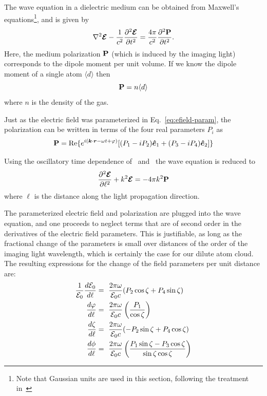 The wave equation in a dielectric medium can be obtained from Maxwell's
equations\footnote{Note that Gaussian units are used in this section, following
the treatment in~\cite{auzinsh2010optically}}, and is given by 
\begin{equation}
 \nabla^{2} \bm{\mathcal{E}} 
 -\frac{1}{c^{2}} \frac{\partial^{2} \bm{\mathcal{E}} } {\partial t^{2}} 
  = \frac{4\pi}{c^{2}} \frac{\partial^{2} \bm{\mathrm{P}} }{\partial t^{2} } .
\end{equation} 
Here, the medium polarization $\bm{\mathrm{P}}$ (which is induced by the imaging light)
corresponds to the dipole moment per unit volume.   If we know the dipole
moment of a single atom $\langle d \rangle$ then \begin{equation}
 \bm{\mathrm{P}} = n \langle d \rangle 
\end{equation}
where $n$ is the density of the gas.

Just as the electric field was parameterized in Eq.~\ref{eq:efield-param}, the
polarization can be written in terms of the four real parameters
$P_{i}$ as 
\begin{equation}
 \bm{\mathrm{P}} = \text{Re} \lbrace e^{i(\bm{k}\cdot\bm{r} - \omega t + \varphi) }
   [(P_{1} - i P_{2}) \bm{\hat{e}}_{1} + ( P_{3} - i P_{4}) \bm{\hat{e}}_{2} ] \rbrace
  \label{eq:pol-param}
\end{equation}

Using the oscillatory time dependence of \efield\ and \dpol\ the wave equation
is reduced to 
\begin{equation}
   \frac{ \partial^{2} \bm{\mathcal{E}}}{\partial \ell^{2} }  + k^{2} \bm{\mathcal{E}} = - 4 \pi k^{2} \bm{\mathrm{P}}
\end{equation}
where $\ell$ is the distance along the light propagation direction. 

The parameterized electric field and polarization are plugged into the wave
equation,  and one proceeds to neglect terms that are of second order in the
derivatives of the electric field parameters.  This is justifiable, as long as the
fractional change of the parameters is small over distances of the order of the
imaging light wavelength, which is certainly the case for our dilute atom
cloud.  The resulting expressions for the change of the field parameters per
unit distance are:
\begin{equation}
\begin{split}
 \frac{1}{\efieldo} \frac{d \efieldo }{ d \ell} & = \   
     \frac{2\pi \omega}{\efieldo c} ( P_{2} \cos\phcChi + P_{4} \sin\phcChi ) \\ 
 \frac{ d \varphi }{d \ell} & = \ 
     \frac{2\pi\omega}{\efieldo c} \left( \frac{ P_{1} }{\cos\phcChi} \right) \\
 \frac{ d \phcChi}{ d \ell} & = \
     \frac{2\pi\omega}{\efieldo c} ( -P_{2} \sin\phcChi + P_{4} \cos\phcChi ) \\
 \frac{ d \phi}{ d \ell} & = \ 
     \frac{2\pi\omega}{\efieldo c }
     \left(  \frac{ P_{1}\sin\phcChi - P_{3}\cos\phcChi }{ \sin\phcChi\cos\phcChi } \right)
 \label{eq:diff-param}
\end{split}
\end{equation} 
 
